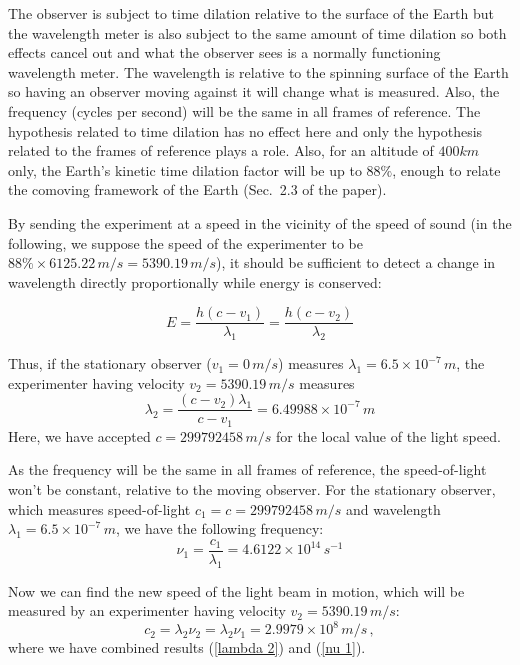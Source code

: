 \documentclass[11pt]{article}
\begin{document}
The observer is subject to time dilation relative to the surface of the Earth but the wavelength meter is also subject to the same amount of time dilation so both effects cancel out and what the observer sees is a normally functioning wavelength meter. The wavelength is relative to the spinning surface of the Earth so having an observer moving against it will change what is measured. Also, the frequency (cycles per second) will be the same in all frames of reference. The hypothesis related to time dilation has no effect here and only the hypothesis related to the frames of reference plays a role. Also, for an altitude of $ 400 km $ only, the Earth's kinetic time dilation factor will be up to $ 88\% $, enough to relate the comoving framework of the Earth (Sec.~2.3 of the paper).

By sending the experiment at a speed in the vicinity of the speed of
sound (in the following, we suppose the speed of the experimenter to be $ 88\% \times 6125.22 \, m/s = 5390.19 \, m/s $), it should be sufficient to detect a change in wavelength
directly proportionally while energy is conserved:

\begin{equation}\label{E equality}
E=\frac{h(c-v_1)}{\lambda_1}=\frac{h(c-v_2)}{\lambda_2}
\end{equation}

Thus, if the stationary observer ($ v_1 = 0\, m/s$) measures $ \lambda_1=6.5\times 10^{-7} \,m$, the experimenter having velocity $ v_2 = 5390.19 \,m/s$ measures
\begin{equation}\label{lambda 2}
\lambda_2=\frac{(c-v_2)\lambda_1}{c-v_1}= 6.49988\times 10^{-7}
\,m
\end{equation}
Here, we have accepted $c=299792458 \, m/s$ for the local value of the light speed. 

As the frequency will be the same in all frames of reference, the speed-of-light won't be constant, relative to the moving observer. For the stationary observer, which measures speed-of-light $c_1=c=299792458 \, m/s$ and wavelength $ \lambda_1=6.5\times 10^{-7} \, m$, we have the following frequency:
\begin{equation}\label{nu 1}
\nu_1=\frac{c_1}{\lambda_1}= 4.6122\times 10^{14}\,s^{-1}
\end{equation}

Now we can find the new speed of the light beam in motion, which will be measured by an experimenter having velocity $ v_2 = 5390.19 \, m/s$:
\begin{equation}\label{c 2}
c_2=\lambda_2 \nu_2=\lambda_2 \nu_1= 2.9979\times 10^{8}\,m/s\,,
\end{equation}
where we have combined results (\ref{lambda 2}) and (\ref{nu 1}).
\end{document}
